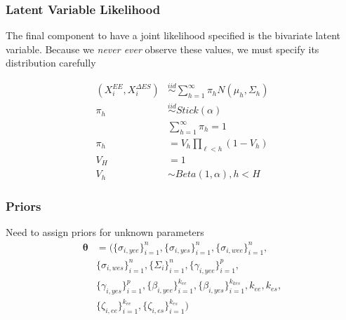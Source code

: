 \documentclass[handout]{beamer}\usepackage[]{graphicx}\usepackage[]{color}
\begin{document}
\begin{frame}
\frametitle{Latent Variable Likelihood}

The final component to have a joint likelihood specified is the bivariate latent variable. Because we \emph{never ever} observe these values, we must specify its distribution carefully

\begin{align}
(X_i^{EE}, X_i^{\Delta ES}) &\overset{iid}{\sim} \sum_{h=1}^{\infty} \pi_h N(\mu_h,\Sigma_h) \\
\pi_h &\overset{iid}{\sim} Stick(\alpha) \\
 & \sum_{h=1}^{\infty} \pi_h = 1 \\
 \pi_h &= V_h \prod_{\ell <  h} (1-V_h) \\
 V_H &= 1\\
 V_h &\sim Beta(1,\alpha), h<H
\end{align}

\end{frame}

\begin{frame}
\frametitle{Priors}
Need to assign priors for unknown parameters 
\begin{align}
\boldsymbol{\theta} &= (\{\sigma_{i,yee} \}_{i=1}^{n}, \{\sigma_{i,yes}\}_{i=1}^{n} , \{\sigma_{i,wee}\}_{i=1}^{n} , \\
& \{\sigma_{i,wes}\}_{i=1}^{n} ,\{\Sigma_{i}\}_{i=1}^{n} , \{\gamma_{i,yee}\}_{i=1}^{p} , \\
& \{\gamma_{i,yes}\}_{i=1}^{p} , \{\beta_{i,yee}\}_{i=1}^{k_{ee}} , \{\beta_{i,yes}\}_{i=1}^{k_{kes}}, k_{ee}, k_{es}, \\
& \{\zeta_{i,ee} \}_{i=1}^{k_{ee}},\{\zeta_{i,es} \}_{i=1}^{k_{es}})
\end{align}

\end{frame}
\end{document}
